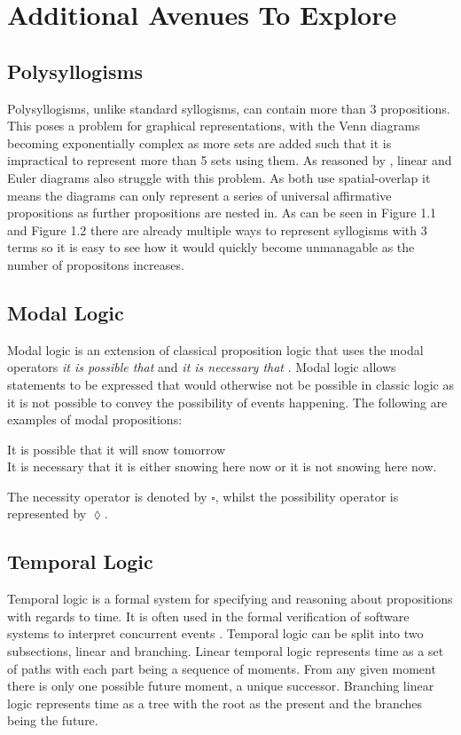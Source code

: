 \documentclass[12pt,a4paper]{report}
\newenvironment{tightcenter}{%
  \setlength\topsep{0pt}
  \setlength\parskip{0pt}
  \begin{center}
}{%
  \end{center}
}
\begin{document}
\section{Additional Avenues To Explore}

\subsection{Polysyllogisms}
Polysyllogisms, unlike standard syllogisms, can contain more than 3 propositions. This poses a problem for graphical representations, with the Venn diagrams becoming exponentially complex as more sets are added such that it is impractical to represent more than 5 sets using them.
As reasoned by \cite{cheng2014graphical}, linear and Euler diagrams also struggle with this problem. As both use spatial-overlap it means the diagrams can only represent a series of universal affirmative propositions as further propositions are nested in. As can be seen in Figure 1.1 and Figure 1.2 there are already multiple ways to represent syllogisms with 3 terms so it is easy to see how it would quickly become unmanagable as the number of propositons increases.

\subsection{Modal Logic}
Modal logic is an extension of classical proposition logic that uses the modal operators \textit{it is possible that} and \textit{it is necessary that} \citep{zalta1988basic}. Modal logic allows statements to be expressed that would otherwise not be possible in classic logic as it is not possible to convey the possibility of events happening. The following are examples of modal propositions:

\bigbreak
\begin{tightcenter}
It is possible that it will snow tomorrow\\
It is necessary that it is either snowing here now or it is not snowing here now.\\
\end{tightcenter}
\bigbreak

The necessity operator is denoted by $\square$, whilst the possibility operator is represented by $\lozenge$.

\subsection{Temporal Logic}
Temporal logic is a formal system for specifying and reasoning about propositions with regards to time. It is often used in the formal verification of software systems to interpret concurrent events \citep{lamport1983good}. Temporal logic can be split into two subsections, linear and branching. Linear temporal logic represents time as a set of paths with each part being a sequence of moments. From any given moment there is only one possible future moment, a unique successor. Branching linear logic represents time as a tree with the root as the present and the branches being the future.
\end{document}
